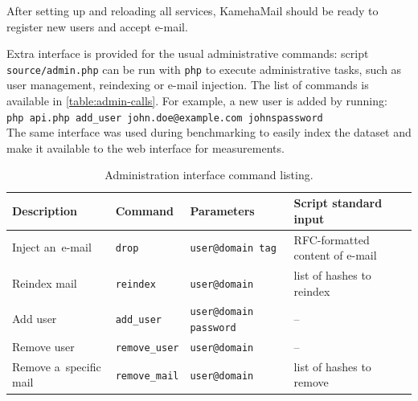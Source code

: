 After setting up and reloading all services, KamehaMail should be ready to register new users and accept e-mail.

Extra interface is provided for the usual administrative commands: script \texttt{source/admin.php} can be run with \texttt{php} to execute administrative tasks, such as user management, reindexing or e-mail injection. The list of commands is available in \autoref{table:admin-calls}. For example, a new user is added by running:\\
\texttt{php api.php add\_user john.doe@example.com johnspassword} \\
The same interface was used during benchmarking to easily index the dataset and make it available to the web interface for measurements.
\begin{table}[t]
\centering
\renewcommand{\arraystretch}{1.4}
\begin{tabular}{p{6em} l l p{6em}}
 \toprule
Description & Command & Parameters & Script standard input \\
\midrule
Inject \mbox{an e-mail} & \texttt{drop} & \texttt{user@domain tag} & RFC-formatted content of e-mail\\
Reindex mail &  \texttt{reindex} & \texttt{user@domain} & list of hashes to reindex\\
Add user & \texttt{add\_user} & \texttt{user@domain password} & -- \\
Remove user & \texttt{remove\_user} & \texttt{user@domain} & -- \\
Remove \mbox{a specific} mail & \texttt{remove\_mail} & \texttt{user@domain} & list of hashes to remove\\
\bottomrule
\end{tabular}
\caption{Administration interface command listing.}
\label{table:admin-calls}
\end{table}
